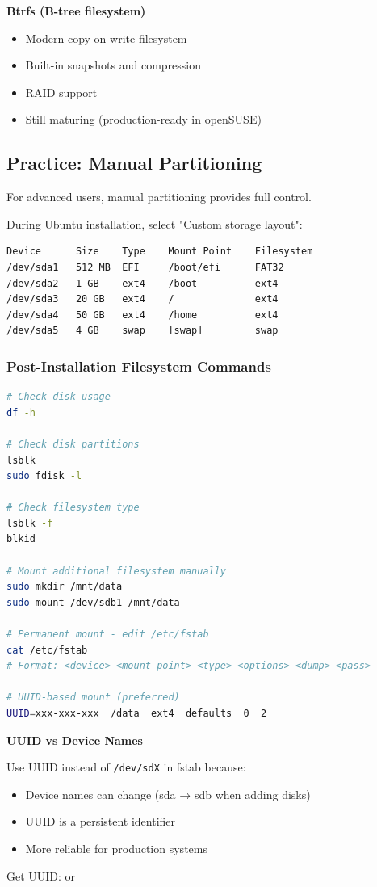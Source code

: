 \noindent
\textbf{Btrfs (B-tree filesystem)}
\begin{itemize}
    \item Modern copy-on-write filesystem
    \item Built-in snapshots and compression
    \item RAID support
    \item Still maturing (production-ready in openSUSE)
\end{itemize}

\subsection{Practice: Manual Partitioning}

For advanced users, manual partitioning provides full control.

During Ubuntu installation, select "Custom storage layout":

\begin{lstlisting}[caption={Example manual partition layout}]
Device      Size    Type    Mount Point    Filesystem
/dev/sda1   512 MB  EFI     /boot/efi      FAT32
/dev/sda2   1 GB    ext4    /boot          ext4
/dev/sda3   20 GB   ext4    /              ext4
/dev/sda4   50 GB   ext4    /home          ext4
/dev/sda5   4 GB    swap    [swap]         swap
\end{lstlisting}

\subsubsection{Post-Installation Filesystem Commands}

\begin{lstlisting}[language=bash, caption={Filesystem verification and management}]
# Check disk usage
df -h

# Check disk partitions
lsblk
sudo fdisk -l

# Check filesystem type
lsblk -f
blkid

# Mount additional filesystem manually
sudo mkdir /mnt/data
sudo mount /dev/sdb1 /mnt/data

# Permanent mount - edit /etc/fstab
cat /etc/fstab
# Format: <device> <mount point> <type> <options> <dump> <pass>

# UUID-based mount (preferred)
UUID=xxx-xxx-xxx  /data  ext4  defaults  0  2
\end{lstlisting}

\begin{notebox}
\textbf{UUID vs Device Names}

Use UUID instead of \texttt{/dev/sdX} in fstab because:
\begin{itemize}
    \item Device names can change (sda → sdb when adding disks)
    \item UUID is a persistent identifier
    \item More reliable for production systems
\end{itemize}

Get UUID:  or 
\end{notebox}

